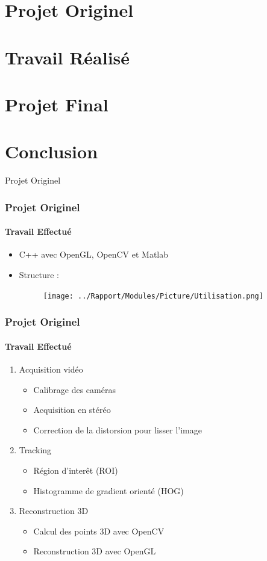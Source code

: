 \documentclass[12pt]{beamer}
\begin{document}
\section{Projet Originel}
\section{Travail Réalisé}
\section{Projet Final}
\section{Conclusion}

\begin{frame}
\Huge{\centerline{Projet Originel}}
\end{frame}

\begin{frame}
\frametitle{Projet Originel}
\framesubtitle{Travail Effectué}
\begin{itemize}
\item{C++ avec OpenGL, OpenCV et Matlab}
\item Structure :
\begin{figure}
\texttt{[image: ../Rapport/Modules/Picture/Utilisation.png]}
\end{figure}
\end{itemize}
\end{frame}

\begin{frame}
\frametitle{Projet Originel}
\framesubtitle{Travail Effectué}
\begin{enumerate}
\item Acquisition vidéo
\begin{itemize}
\item Calibrage des caméras
\item Acquisition en stéréo
\item Correction de la distorsion pour lisser l'image
\end{itemize}
\item Tracking
\begin{itemize}
\item Région d'interêt (ROI)
\item Histogramme de gradient orienté (HOG)
\end{itemize}
\item Reconstruction 3D
\begin{itemize}
\item Calcul des points 3D avec OpenCV
\item Reconstruction 3D avec OpenGL
\end{itemize}
\end{enumerate}
\end{frame}
\end{document}

